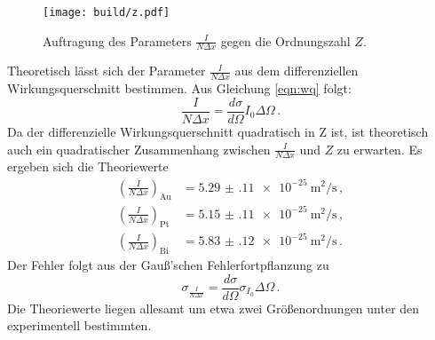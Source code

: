 \begin{figure}
  \centering
  \texttt{[image: build/z.pdf]}
  \caption{Auftragung des Parameters $\frac{I}{N \Delta x}$ gegen die Ordnungszahl $Z$.}
  \label{fig:z}
\end{figure}

Theoretisch lässt sich der Parameter $\frac{I}{N \Delta x}$ aus dem
differenziellen Wirkungsquerschnitt bestimmen. Aus Gleichung \eqref{eqn:wq} folgt:
\begin{equation}
  \frac{I}{N \Delta x}= \frac{d \sigma}{d \Omega}I_0 \Delta \Omega \,.
\end{equation}
Da der differenzielle Wirkungsquerschnitt quadratisch in Z ist, ist theoretisch auch ein
quadratischer Zusammenhang zwischen $\frac{I}{N \Delta x}$ und $Z$ zu erwarten.
Es ergeben sich die Theoriewerte
\begin{align*}
  \left(\frac{I}{N \Delta x}\right)_{\text{Au}}&= \SI{5.29(11)e-25}{\metre\squared\per\second} \,, \\
  \left(\frac{I}{N \Delta x}\right)_{\text{Pt}}&= \SI{5.15(11)e-25}{\metre\squared\per\second} \,, \\
  \left(\frac{I}{N \Delta x}\right)_{\text{Bi}}&= \SI{5.83(12)e-25}{\metre\squared\per\second} \,.
\end{align*}
Der Fehler folgt aus der Gauß'schen Fehlerfortpflanzung zu
\begin{equation*}
  \sigma_{\frac{I}{N \Delta x}}=\frac{d \sigma}{d \Omega} \sigma_{I_0} \Delta \Omega \,.
\end{equation*}
Die Theoriewerte liegen allesamt um etwa zwei Größenordnungen unter den experimentell bestimmten.
